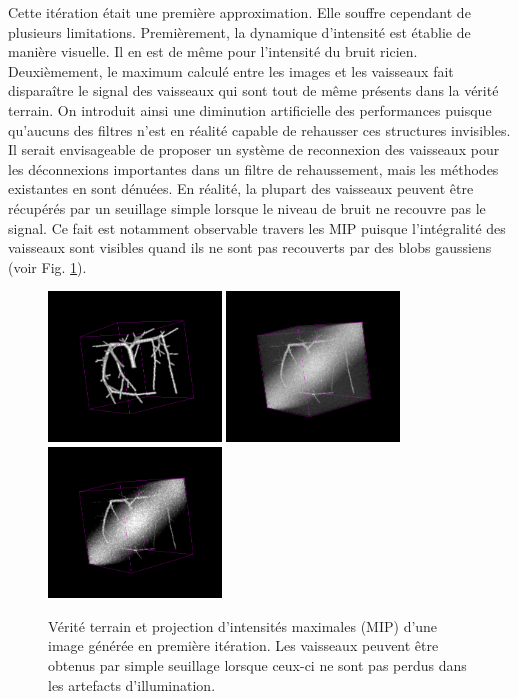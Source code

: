 Cette itération était une première approximation. Elle souffre cependant de plusieurs limitations. Premièrement, la dynamique d'intensité est établie de manière visuelle. Il en est de même pour l'intensité du bruit ricien. Deuxièmement, le maximum calculé entre les images et les vaisseaux fait disparaître le signal des vaisseaux qui sont tout de même présents dans la vérité terrain. On introduit ainsi une diminution artificielle des performances puisque qu'aucuns des filtres n'est en réalité capable de rehausser ces structures invisibles. Il serait envisageable de proposer un système de reconnexion des vaisseaux pour les déconnexions importantes dans un filtre de rehaussement, mais les méthodes existantes en sont dénuées. En réalité, la plupart des vaisseaux peuvent être récupérés par un seuillage simple lorsque le niveau de bruit ne recouvre pas le signal. Ce fait est notamment observable travers les MIP puisque l'intégralité des vaisseaux sont visibles quand ils ne sont pas recouverts par des blobs gaussiens (voir Fig. \ref{fig:vascu_v1_problems}).

\begin{figure}[!ht]
  \centering
  \includegraphics[height=4cm]{Images/vascu_v1_gt.png}
  \includegraphics[height=4cm]{Images/vascu_v1_original.png}
  \includegraphics[height=4cm]{Images/vascu_v1_thresholding.png}
  \caption{Vérité terrain et projection d'intensités maximales (MIP) d'une image générée en première itération. Les vaisseaux peuvent être obtenus par simple seuillage lorsque ceux-ci ne sont pas perdus dans les artefacts d'illumination.}
  \label{fig:vascu_v1_problems}
\end{figure}

